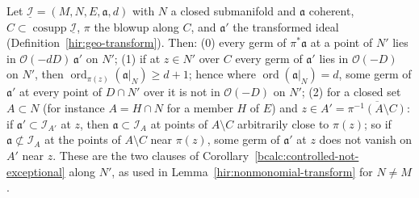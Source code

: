 \begin{corollary}
\label{bcalc:controlled-not-exceptional-along}
\leanok
Let \(\underline{\mathcal I}=(M,N,E,\mathfrak a,d)\) with \(N\) a closed submanifold and \(\mathfrak a\) coherent, \(C\subset\operatorname{cosupp}\underline{\mathcal I}\),
\(\pi\) the blowup along \(C\), and \(\mathfrak a'\) the transformed ideal (Definition~\ref{hir:geo-transform}). Then:
(0) every germ of \(\pi^*\mathfrak a\) at a point of \(N'\) lies in \(\mathcal O(-dD)\,\mathfrak a'\) on \(N'\);
(1) if at \(z\in N'\) over \(C\) every germ of \(\mathfrak a'\) lies in \(\mathcal O(-D)\) on \(N'\), then \(\operatorname{ord}_{\pi(z)}(\mathfrak a|_N)\ge d+1\); hence where
\(\operatorname{ord}(\mathfrak a|_N)=d\), some germ of \(\mathfrak a'\) at every point of \(D\cap N'\) over it is not in \(\mathcal O(-D)\) on \(N'\);
(2) for a closed set \(A\subset N\) (for instance \(A=H\cap N\) for a member \(H\) of \(E\)) and \(z\in A'=\overline{\pi^{-1}(A\setminus C)}\): if
\(\mathfrak a'\subset\mathcal I_{A'}\) at \(z\), then \(\mathfrak a\subset\mathcal I_A\) at points of \(A\setminus C\) arbitrarily close to \(\pi(z)\); so if \(\mathfrak a\not\subset\mathcal I_A\) at
the points of \(A\setminus C\) near \(\pi(z)\), some germ of \(\mathfrak a'\) at \(z\) does not vanish on \(A'\) near \(z\).
These are the two clauses of Corollary~\ref{bcalc:controlled-not-exceptional} along \(N'\), as used in Lemma~\ref{hir:nonmonomial-transform} for \(N\ne M\).
\end{corollary}
